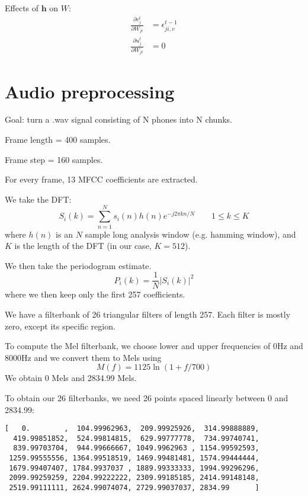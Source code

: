 \documentclass{article}
\begin{document}
Effects of $\mathbf{h}$ on $W$:
\begin{align}
\frac{\partial v_j^t}{\partial W_{ji}} &= \epsilon_{ji,v}^{t-1} \\
\frac{\partial u_j^t}{\partial W_{ji}} &= 0
\end{align}












\newpage
\section{Audio preprocessing}
Goal: turn a .wav signal consisting of N phones into N chunks.

Frame length = 400 samples.

Frame step = 160 samples.

For every frame, 13 MFCC coefficients are extracted.

We take the DFT:
\begin{equation}
S_i(k) = \sum_{n=1}^N s_i(n)h(n)e^{-j2\pi kn/N}\qquad1\leq k\leq K
\end{equation}
where $h(n)$ is an $N$ sample long analysis window (e.g. hamming window), and $K$ is the length of the DFT (in our case, $K=512$).

We then take the periodogram estimate.
\begin{equation}
P_i(k) = \frac{1}{N}\left|S_i(k)\right|^2
\end{equation}
where we then keep only the first 257 coefficients.

We have a filterbank of 26 triangular filters of length 257. Each filter is mostly zero, except its specific region.

To compute the Mel filterbank, we choose lower and upper frequencies of 0Hz and 8000Hz and we convert them to Mels using
\begin{equation}
M(f) = 1125\ln\left(1 + f/700\right)
\end{equation}
We obtain 0 Mels and 2834.99 Mels.

To obtain our 26 filterbanks, we need 26 points spaced linearly between 0 and 2834.99:
\begin{verbatim}
[   0.        ,  104.99962963,  209.99925926,  314.99888889,
  419.99851852,  524.99814815,  629.99777778,  734.99740741,
  839.99703704,  944.99666667, 1049.9962963 , 1154.99592593,
 1259.99555556, 1364.99518519, 1469.99481481, 1574.99444444,
 1679.99407407, 1784.9937037 , 1889.99333333, 1994.99296296,
 2099.99259259, 2204.99222222, 2309.99185185, 2414.99148148,
 2519.99111111, 2624.99074074, 2729.99037037, 2834.99      ]
\end{verbatim}
\end{document}
